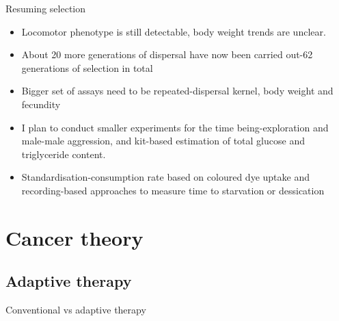 \documentclass{beamer}
\begin{document}
\begin{frame}{Resuming selection}
\begin{itemize}
	\item<1-> Locomotor phenotype is still detectable, body weight trends are unclear.
	\item<1-> About 20 more generations of dispersal have now been carried out-62 generations of selection in total
	\item<2-> Bigger set of assays need to be repeated-dispersal kernel, body weight and fecundity
	\item<2-> I plan to conduct smaller experiments for the time being-exploration and male-male aggression, and kit-based estimation of total glucose and triglyceride content.
	\item<3-> Standardisation-consumption rate based on coloured dye uptake and recording-based approaches to measure time to starvation or dessication
\end{itemize}
\end{frame}
\section{Cancer theory}
\subsection{Adaptive therapy}
\begin{frame}{Conventional vs adaptive therapy}
\end{frame}
\end{document}
